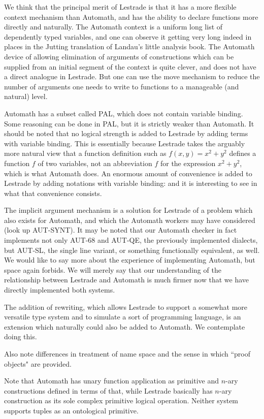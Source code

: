 \documentclass{article}
\begin{document}
We think that the principal merit of Lestrade is that it has a more flexible context mechanism than Automath, and has the ability to declare functions more directly and naturally.
The Automath context is a uniform long list of dependently typed variables, and one can observe it getting very long indeed in places in the Jutting translation of Landau's little analysis book.  The Automath device of allowing elimination of arguments of constructions which can be supplied from an initial segment of the context is quite clever, and does not have a direct analogue in Lestrade.  But one can use the move mechanism to reduce the number of arguments one needs to write to functions to a manageable (and natural) level.

Automath has a subset called PAL, which does not contain variable binding.  Some reasoning can be done in PAL, but it is strictly weaker than Automath.
It should be noted that no logical strength is added to Lestrade by adding terms with variable binding.  This is essentially because Lestrade takes the arguably more natural view that a function definition such as $f(x,y)=x^2+y^2$ defines a function $f$ of two variables, not an abbreviation $f$ for the expression $x^2+y^2$, which is what Automath does.  An enormous amount of convenience is added to Lestrade by adding notations with variable binding:  and it is interesting to see in what that convenience consists.

The implicit argument mechanism is a solution for Lestrade of a problem which also exists for Automath, and which the Automath workers may have considered (look up AUT-SYNT).  It may be noted that our Automath checker in fact implements not only AUT-68 and AUT-QE, the previously implemented dialects, but AUT-SL, the single line variant, or something functionally equivalent, as well.  We would like to say more about the experience of implementing Automath, but space again forbids.  We will merely say that our understanding of the relationship between Lestrade and Automath is much firmer now that we have directly implemented both systems.

The addition of rewriting, which allows Lestrade to support a somewhat more versatile type system and to simulate a sort of programming language, is an extension which naturally could also be added to Automath.  We contemplate doing this.

Also note differences in treatment of name space and the sense in which ``proof objects" are provided.

Note that Automath has unary function application as primitive and $n$-ary constructions defined in terms of that, while Lestrade basically has
$n$-ary construction as its sole complex primitive logical operation.  Neither system supports tuples as an ontological primitive.
\end{document}
